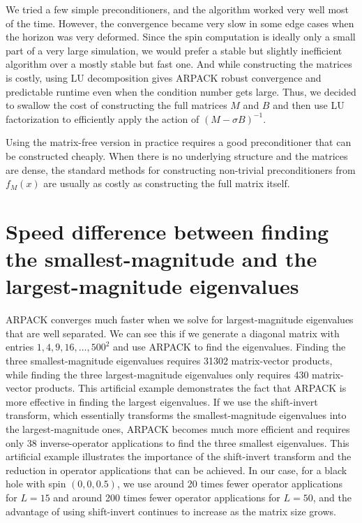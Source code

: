 \documentclass{iopjournal}
\begin{document}
We tried a few simple preconditioners, and the algorithm worked very well most of the time. However, the convergence became very slow in some edge cases when the horizon was very deformed. Since the spin computation is ideally only a small part of a very large simulation, we would prefer a stable but slightly inefficient algorithm over a mostly stable but fast one. And while constructing the matrices is costly, using LU decomposition gives ARPACK robust convergence and predictable runtime even when the condition number gets large. Thus, we decided to swallow the cost of constructing the full matrices $M$ and $B$ and then use LU factorization to efficiently apply the action of $(M- \sigma B)^{-1}$.

Using the matrix-free version in practice requires a good preconditioner that can be constructed cheaply. When there is no underlying structure and the matrices are dense, the standard methods for constructing non-trivial preconditioners from $f_{M}(x)$ are usually as costly as constructing the full matrix itself.


\section{\label{sec:Speed difference between finding the smallest and the largest eigenvalues} Speed difference between finding the smallest-magnitude and the largest-magnitude eigenvalues}

ARPACK converges much faster when we solve for largest-magnitude eigenvalues that are well separated. We can see this if we generate a diagonal matrix with entries $1,4,9,16, \ldots, 500^2$ and use ARPACK to find the eigenvalues. Finding the three smallest-magnitude eigenvalues requires 31302 matrix-vector products, while finding the three largest-magnitude eigenvalues only requires 430 matrix-vector products. This artificial example demonstrates the fact that ARPACK is more effective in finding the largest eigenvalues. If we use the shift-invert transform, which essentially transforms the smallest-magnitude eigenvalues into the largest-magnitude ones, ARPACK becomes much more efficient and requires only 38 inverse-operator applications to find the three smallest eigenvalues. This artificial example illustrates the importance of the shift-invert transform and the reduction in operator applications that can be achieved. In our case, for a black hole with spin $(0,0,0.5)$, we use around 20 times fewer operator applications for $L=15$ and around 200 times fewer operator applications for $L=50$, and the advantage of using shift-invert continues to increase as the matrix size grows.


\clearpage


\end{document}
